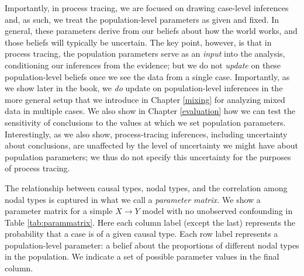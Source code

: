 \documentclass[12pt,]{book}
\begin{document}
Importantly, in process tracing, we are focused on drawing case-level inferences and, as such, we treat the population-level parameters as given and fixed. In general, these parameters derive from our beliefs about how the world works, and those beliefs will typically be uncertain. The key point, however, is that in process tracing, the population parameters serve as an \emph{input} into the analysis, conditioning our inferences from the evidence; but we do not \emph{update} on these population-level beliefs once we see the data from a single case. Importantly, as we show later in the book, we \emph{do} update on population-level inferences in the more general setup that we introduce in Chapter \ref{mixing} for analyzing mixed data in multiple cases. We also show in Chapter \ref{evaluation} how we can test the sensitivity of conclusions to the values at which we set population parameters. Interestingly, as we also show, process-tracing inferences, including uncertainty about conclusions, are unaffected by the level of uncertainty we might have about population parameters; we thus do not specify this uncertainty for the purposes of process tracing.

The relationship between causal types, nodal types, and the correlation among nodal types is captured in what we call a \emph{parameter matrix.} We show a parameter matrix for a simple \(X \rightarrow Y\) model with no unobserved confounding in Table \ref{tab:parammatrix}. Here each column label (except the last) represents the probability that a case is of a given causal type. Each row label represents a population-level parameter: a belief about the proportions of different nodal types in the population. We indicate a set of possible parameter values in the final column.
\end{document}
